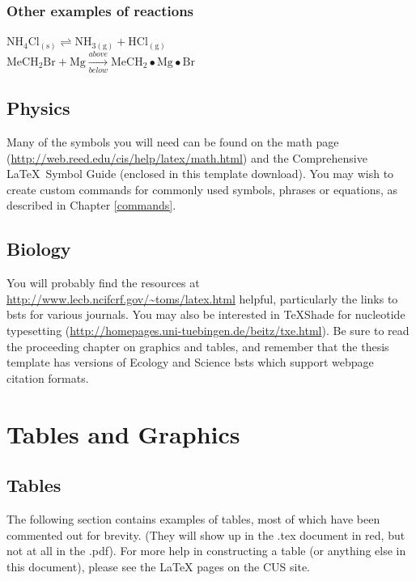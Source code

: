 \documentclass[12pt,twoside]{reedthesis}
\begin{document}
\subsection{Other examples of reactions}
$\mathrm{NH_4Cl_{(s)}} \rightleftharpoons \mathrm{NH_{3(g)}+HCl_{(g)}}$\\
$\mathrm{MeCH_2Br + Mg} \xrightarrow[below]{above} \mathrm{MeCH_2\bullet Mg \bullet Br}$

\section{Physics}

Many of the symbols you will need can be found on the math page (\url{http://web.reed.edu/cis/help/latex/math.html}) and the Comprehensive \LaTeX\ Symbol Guide (enclosed in this template download).  You may wish to create custom commands for commonly used symbols, phrases or equations, as described in Chapter \ref{commands}.

\section{Biology}
You will probably find the resources at \url{http://www.lecb.ncifcrf.gov/~toms/latex.html} helpful, particularly the links to bsts for various journals. You may also be interested in TeXShade for nucleotide typesetting (\url{http://homepages.uni-tuebingen.de/beitz/txe.html}).  Be sure to read the proceeding chapter on graphics and tables, and remember that the thesis template has versions of Ecology and Science bsts which support webpage citation formats.

\chapter{Tables and Graphics}

\section{Tables}
The following section contains examples of tables, most of which have been commented out for brevity. (They will show up in the .tex document in red, but not at all in the .pdf). For more help in constructing a table (or anything else in this document), please see the LaTeX pages on the CUS site.
\end{document}
